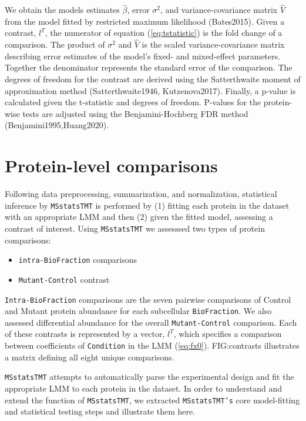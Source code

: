 \documentclass[11pt]{elife}\usepackage[]{graphicx}\usepackage[]{color}
\begin{document}
We obtain the models estimates $\hat{\beta}$, error $\sigma^2$, and
variance-covariance matrix $\hat{V}$ from the model fitted by restricted maximum
likelihood (Bates2015). Given a contrast, $l^T$, the numerator of equation
(\ref{eq:tstatistic}) is the fold change of a comparison.  The product of
$\sigma^2$ and $\hat{V}$ is the scaled variance-covariance matrix describing
error estimates of the model's fixed- and mixed-effect parameters.  Together the
denominator represents the standard error of the comparison. The degrees of
freedom for the contrast are derived using the Satterthwaite moment of
approximation method (Satterthwaite1946, Kutzenova2017).  Finally, a p-value is
calculated given the t-statistic and degrees of freedom.  P-values for the
protein-wise tests are adjusted using the Benjamini-Hochberg FDR method
(Benjamini1995,Huang2020).\\


\section{Protein-level comparisons}

Following data preprocessing, summarization, and normalization, statistical
inference by \texttt{MSstatsTMT} is performed by (1) fitting each protein in the
dataset with an appropriate LMM and then (2) given the fitted model, assessing a
contrast of interest. Using \texttt{MSstatsTMT} we assesssed two types of
protein comparisons:
\begin{itemize}
	\item \texttt{intra-BioFraction} comparisons
	\item \texttt{Mutant-Control} contrast
\end{itemize}

\texttt{Intra-BioFraction} comparisons are the seven pairwise comparisons of 
Control and Mutant protein abundance for each subcellular
\texttt{BioFraction}. We also assessed differential abundance for the 
overall \texttt{Mutant-Control} comparison. Each of these contrasts is 
represented by a vector, $l^T$, which specifies a comparison between 
coefficients of \texttt{Condition} in the LMM (\ref{eq:fx0}).
FIG:contrasts illustrates a matrix defining all eight unique comparisons.

\texttt{MSstatsTMT} attempts to automatically parse the experimental design and
fit the appropriate LMM to each protein in the dataset. In order to understand 
and extend the function of \texttt{MSstatsTMT}, 
we extracted \texttt{MSstatsTMT's} core model-fitting and statistical 
testing steps and illustrate them here.
\end{document}
